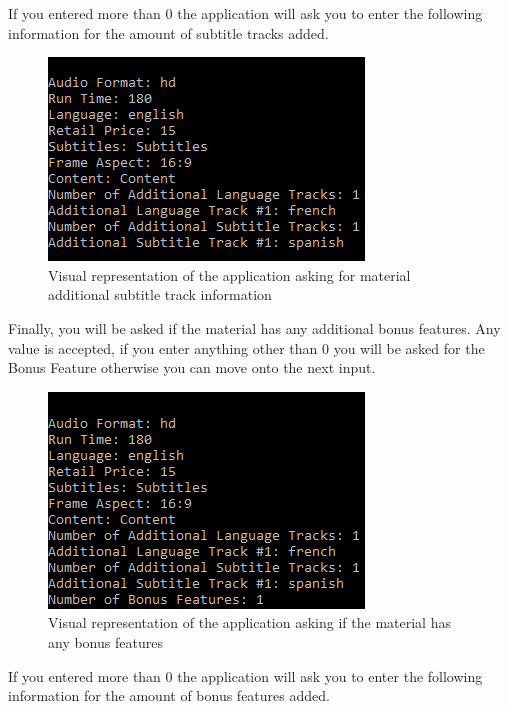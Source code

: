 \documentclass[
  english,
  a4paper,
,tablecaptionabove
]{scrartcl}
\begin{document}
If you entered more than 0 the application will ask you to enter the
following information for the amount of subtitle tracks added.

\begin{figure}
\centering
\includegraphics{images/user-guide/maintenance-mode/add-material-additional-subtitle-track.png}
\caption{Visual representation of the application asking for material
additional subtitle track information}
\end{figure}

Finally, you will be asked if the material has any additional bonus
features. Any value is accepted, if you enter anything other than 0 you
will be asked for the Bonus Feature otherwise you can move onto the next
input.

\begin{figure}
\centering
\includegraphics{images/user-guide/maintenance-mode/add-material-number-of-bonus-features.png}
\caption{Visual representation of the application asking if the material
has any bonus features}
\end{figure}

If you entered more than 0 the application will ask you to enter the
following information for the amount of bonus features added.
\end{document}
